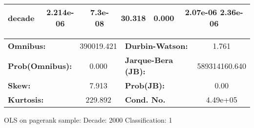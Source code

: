 \begin{center}
\begin{tabular}{lccccc}
\textbf{decade}             &    2.214e-06  &      7.3e-08     &    30.318  &         0.000        &      2.07e-06  2.36e-06       \\
\bottomrule
\end{tabular}
\begin{tabular}{lclc}
\textbf{Omnibus:}       & 390019.421 & \textbf{  Durbin-Watson:     } &       1.761    \\
\textbf{Prob(Omnibus):} &    0.000   & \textbf{  Jarque-Bera (JB):  } & 589314160.640  \\
\textbf{Skew:}          &    7.913   & \textbf{  Prob(JB):          } &        0.00    \\
\textbf{Kurtosis:}      &  229.892   & \textbf{  Cond. No.          } &    4.49e+05    \\
\bottomrule
\end{tabular}
\end{center}
\break
OLS on pagerank sample: Decade: 2000 Classification: 1
